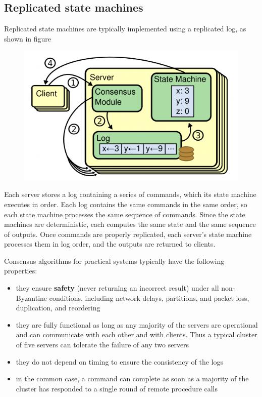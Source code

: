 \documentclass[11pt]{article}
\begin{document}
\subsection{Replicated state machines}
\label{sec:org2f1a595}
Replicated state machines are typically implemented using a replicated log, as shown in figure
\begin{figure}[htbp]
\centering
\includegraphics[width=.7\textwidth]{../images/6.824/2.png}
\label{}
\end{figure}
Each server stores a log containing a series of commands, which its state machine executes in
order. Each log contains the same commands in the same order, so each state machine processes
the same sequence of commands. Since the state machines are deterministic, each computes the
same state and the same sequence of outputs. Once commands are properly replicated, each
server’s state machine processes them in log order, and the outputs are returned to clients.

Consensus algorithms for practical systems typically have the following properties:
\begin{itemize}
\item they ensure \textbf{safety} (never returning an incorrect result) under all non-Byzantine conditions,
including network delays, partitions, and packet loss, duplication, and reordering
\item they are fully functional as long as any majority of the servers are operational and can
communicate with each other and with clients. Thus a typical cluster of five servers can
tolerate the failure of any two servers
\item they do not depend on timing to ensure the consistency of the logs
\item in the common case, a command can complete as soon as a majority of the cluster has responded
to a single round of remote procedure calls
\end{itemize}
\end{document}

